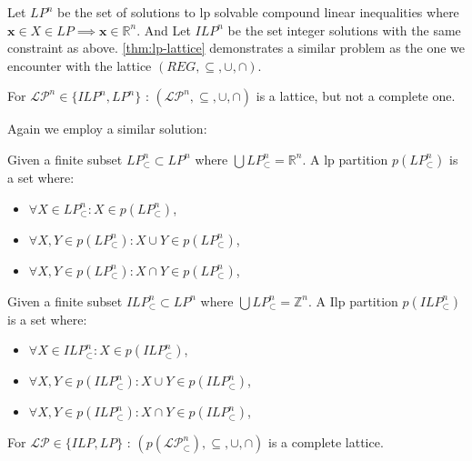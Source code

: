 Let $LP^n$ be the set of solutions to \gls{lp} solvable compound linear inequalities where $\mathbf{x} \in X \in LP \implies \mathbf{x} \in \mathbb{R}^n$.
And Let $ILP^n$ be the set integer solutions with the same constraint as above.
\autoref{thm:lp-lattice} demonstrates a similar problem as the one we encounter with the lattice $(REG, \subseteq, \cup, \cap)$.

\begin{theorem}\label{thm:lp-lattice}
    For $\mathcal{LP}^n \in \{ILP^n, LP^n\}$ : $(\mathcal{LP}^n, \subseteq, \cup, \cap)$ is a lattice, but not a complete one.
\end{theorem}

Again we employ a similar solution:

\begin{definition}
    Given a finite subset $LP_\subset^n \subset LP^n$ where $\bigcup LP_\subset^n = \mathbb{R}^n$.
    A \gls{lp} partition $p(LP_\subset^n)$ is a set where:
    \begin{itemize}
        \item $\forall X \in LP_\subset^n : X \in p(LP_\subset^n)$,
        \item $\forall X, Y \in p(LP_\subset^n) : X \cup Y \in p(LP_\subset^n)$,
        \item $\forall X, Y \in p(LP_\subset^n) : X \cap Y \in p(LP_\subset^n)$,
    \end{itemize}
\end{definition}

\begin{definition}
    Given a finite subset $ILP_\subset^n \subset LP^n$ where $\bigcup LP_\subset^n = \mathbb{Z}^n$.
    A I\gls{lp} partition $p(ILP_\subset^n)$ is a set where:
    \begin{itemize}
        \item $\forall X \in ILP_\subset^n : X \in p(ILP_\subset^n)$,
        \item $\forall X, Y \in p(ILP_\subset^n) : X \cup Y \in p(ILP_\subset^n)$,
        \item $\forall X, Y \in p(ILP_\subset^n) : X \cap Y \in p(ILP_\subset^n)$,
    \end{itemize}
\end{definition}

\begin{theorem}\label{thm:lp-partition-lattice}
    For $\mathcal{LP} \in \{ILP, LP\}$ : $(p(\mathcal{LP}_\subset^n), \subseteq, \cup, \cap)$ is a complete lattice.
\end{theorem}

